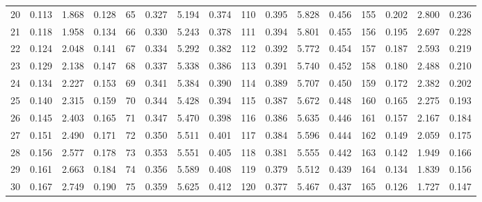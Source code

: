 \begin{table}
{\begin{tabular}{rrrr|rrrr|rrrr|rrrr}
 20 & \tiny{  0.113} &   1.868 & \tiny{  0.128} &  65 & \tiny{  0.327} &   5.194 & \tiny{  0.374} & 110 & \tiny{  0.395} &   5.828 & \tiny{  0.456} & 155 & \tiny{  0.202} &   2.800 & \tiny{  0.236}\\
 21 & \tiny{  0.118} &   1.958 & \tiny{  0.134} &  66 & \tiny{  0.330} &   5.243 & \tiny{  0.378} & 111 & \tiny{  0.394} &   5.801 & \tiny{  0.455} & 156 & \tiny{  0.195} &   2.697 & \tiny{  0.228}\\
 22 & \tiny{  0.124} &   2.048 & \tiny{  0.141} &  67 & \tiny{  0.334} &   5.292 & \tiny{  0.382} & 112 & \tiny{  0.392} &   5.772 & \tiny{  0.454} & 157 & \tiny{  0.187} &   2.593 & \tiny{  0.219}\\
 23 & \tiny{  0.129} &   2.138 & \tiny{  0.147} &  68 & \tiny{  0.337} &   5.338 & \tiny{  0.386} & 113 & \tiny{  0.391} &   5.740 & \tiny{  0.452} & 158 & \tiny{  0.180} &   2.488 & \tiny{  0.210}\\
 24 & \tiny{  0.134} &   2.227 & \tiny{  0.153} &  69 & \tiny{  0.341} &   5.384 & \tiny{  0.390} & 114 & \tiny{  0.389} &   5.707 & \tiny{  0.450} & 159 & \tiny{  0.172} &   2.382 & \tiny{  0.202}\\
 25 & \tiny{  0.140} &   2.315 & \tiny{  0.159} &  70 & \tiny{  0.344} &   5.428 & \tiny{  0.394} & 115 & \tiny{  0.387} &   5.672 & \tiny{  0.448} & 160 & \tiny{  0.165} &   2.275 & \tiny{  0.193}\\
 26 & \tiny{  0.145} &   2.403 & \tiny{  0.165} &  71 & \tiny{  0.347} &   5.470 & \tiny{  0.398} & 116 & \tiny{  0.386} &   5.635 & \tiny{  0.446} & 161 & \tiny{  0.157} &   2.167 & \tiny{  0.184}\\
 27 & \tiny{  0.151} &   2.490 & \tiny{  0.171} &  72 & \tiny{  0.350} &   5.511 & \tiny{  0.401} & 117 & \tiny{  0.384} &   5.596 & \tiny{  0.444} & 162 & \tiny{  0.149} &   2.059 & \tiny{  0.175}\\
 28 & \tiny{  0.156} &   2.577 & \tiny{  0.178} &  73 & \tiny{  0.353} &   5.551 & \tiny{  0.405} & 118 & \tiny{  0.381} &   5.555 & \tiny{  0.442} & 163 & \tiny{  0.142} &   1.949 & \tiny{  0.166}\\
 29 & \tiny{  0.161} &   2.663 & \tiny{  0.184} &  74 & \tiny{  0.356} &   5.589 & \tiny{  0.408} & 119 & \tiny{  0.379} &   5.512 & \tiny{  0.439} & 164 & \tiny{  0.134} &   1.839 & \tiny{  0.156}\\
 30 & \tiny{  0.167} &   2.749 & \tiny{  0.190} &  75 & \tiny{  0.359} &   5.625 & \tiny{  0.412} & 120 & \tiny{  0.377} &   5.467 & \tiny{  0.437} & 165 & \tiny{  0.126} &   1.727 & \tiny{  0.147}\\

\end{tabular}}
\end{table}
